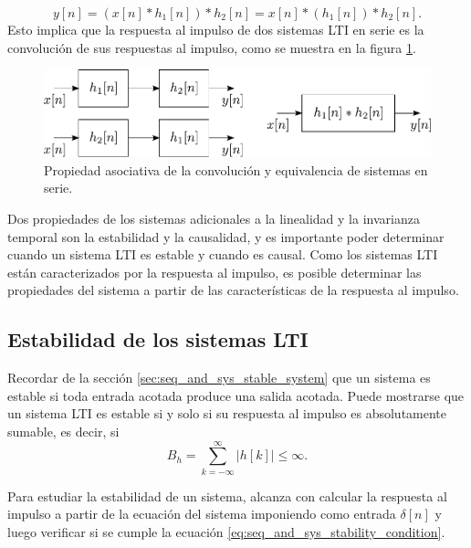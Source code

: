 \documentclass[a4paper]{report}
\begin{document}
\begin{itemize}
 \[
  y[n]=(x[n]*h_1[n])*h_2[n]=x[n]*(h_1[n])*h_2[n].
 \]
 Esto implica que la respuesta al impulso de dos sistemas LTI en serie es la convolución de sus respuestas al impulso, como se muestra en la figura \ref{fig:lti_properties_asociative}.
 \begin{figure}[!htb]
  \begin{minipage}[c]{0.65\textwidth}
    \includegraphics[width=\textwidth]{figuras/lti_properties_asociative.pdf}
  \end{minipage}\hfill
  \begin{minipage}[c]{0.25\textwidth}
    \caption{
     Propiedad asociativa de la convolución y equivalencia de sistemas en serie. 
    }\label{fig:lti_properties_asociative}
  \end{minipage}
 \end{figure}
\end{itemize}

Dos propiedades de los sistemas adicionales a la linealidad y la invarianza temporal son la estabilidad y la causalidad, y es importante poder determinar cuando un sistema LTI es estable y cuando es causal. Como los sistemas LTI están caracterizados por la respuesta al impulso, es posible determinar las propiedades del sistema a partir de las características de la respuesta al impulso.

\subsection{Estabilidad de los sistemas LTI}  
 
Recordar de la sección \ref{sec:seq_and_sys_stable_system} que un sistema es estable si toda entrada acotada produce una salida acotada. Puede mostrarse que un sistema LTI es estable si y solo si su respuesta al impulso es absolutamente sumable, es decir, si
\begin{equation}\label{eq:seq_and_sys_stability_condition}
 B_h=\sum_{k=-\infty}^\infty|h[k]|\leq\infty. 
\end{equation}

Para estudiar la estabilidad de un sistema, alcanza con calcular la respuesta al impulso a partir de la ecuación del sistema imponiendo como entrada \(\delta[n]\) y luego verificar si se cumple la ecuación \ref{eq:seq_and_sys_stability_condition}.
\end{document}
